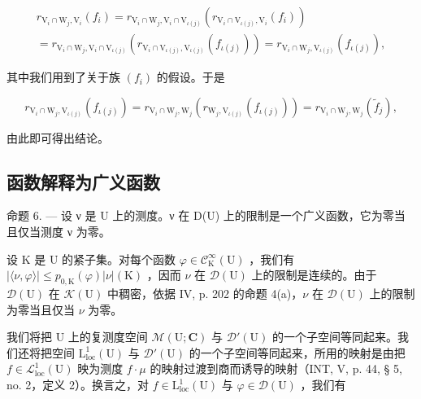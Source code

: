 \[
\begin{array}{c} r _ {\mathrm{V} _ {i} \cap \mathrm{W} _ {j}, \mathrm{V} _ {i}} (f _ {i}) = r _ {\mathrm{V} _ {i} \cap \mathrm{W} _ {j}, \mathrm{V} _ {i} \cap \mathrm{V} _ {\iota (j)}} (r _ {\mathrm{V} _ {i} \cap \mathrm{V} _ {\iota (j)}, \mathrm{V} _ {i}} (f _ {i})) \\ = r _ {\mathrm{V} _ {i} \cap \mathrm{W} _ {j}, \mathrm{V} _ {i} \cap \mathrm{V} _ {\iota (j)}} (r _ {\mathrm{V} _ {i} \cap \mathrm{V} _ {\iota (j)}, \mathrm{V} _ {\iota (j)}} (f _ {\iota (j)})) = r _ {\mathrm{V} _ {i} \cap \mathrm{W} _ {j}, \mathrm{V} _ {\iota (j)}} (f _ {\iota (j)}), \end{array}
\]

其中我们用到了关于族 \((f_{i})\) 的假设。于是

\[
r _ {\mathrm{V} _ {i} \cap \mathrm{W} _ {j}, \mathrm{V} _ {\iota (j)}} (f _ {\iota (j)}) = r _ {\mathrm{V} _ {i} \cap \mathrm{W} _ {j}, \mathrm{W} _ {j}} (r _ {\mathrm{W} _ {j}, \mathrm{V} _ {\iota (j)}} (f _ {\iota (j)})) = r _ {\mathrm{V} _ {i} \cap \mathrm{W} _ {j}, \mathrm{W} _ {j}} (\widetilde {f} _ {j}),
\]

由此即可得出结论。

\subsection{函数解释为广义函数}

命题 6. --- 设 ν 是 U 上的测度。ν 在 D(U) 上的限制是一个广义函数，它为零当且仅当测度 ν 为零。

设 K 是 U 的紧子集。对每个函数 \(\varphi\in\mathcal{C}_{\mathrm{K}}^{\infty}(\mathrm{U})\) ，我们有 \(|\langle\nu,\varphi\rangle|\leqslant p_{0,\mathrm{K}}(\varphi)|\nu|(\mathrm{K})\) ，因而 \(\nu\) 在 \(\mathcal{D}(\mathrm{U})\) 上的限制是连续的。由于 \(\mathcal{D}(\mathrm{U})\) 在 \(\mathcal{K}(\mathrm{U})\) 中稠密，依据 IV, p. 202 的命题 4(a)，\(\nu\) 在 \(\mathcal{D}(\mathrm{U})\) 上的限制为零当且仅当 \(\nu\) 为零。

我们将把 U 上的复测度空间 \(\mathcal{M}(\mathrm{U};\mathbf{C})\) 与 \(\mathcal{D}'(\mathrm{U})\) 的一个子空间等同起来。我们还将把空间 \(\mathrm{L}_{\mathrm{loc}}^{1}(\mathrm{U})\) 与 \(\mathcal{D}'(\mathrm{U})\) 的一个子空间等同起来，所用的映射是由把 \(f\in \mathcal{L}_{\mathrm{loc}}^{1}(\mathrm{U})\) 映为测度 \(f\cdot \mu\) 的映射过渡到商而诱导的映射（INT, V, p. 44, § 5, no. 2，定义 2）。换言之，对 \(f\in \mathrm{L}_{\mathrm{loc}}^{1}(\mathrm{U})\) 与 \(\varphi \in \mathcal{D}(\mathrm{U})\) ，我们有

